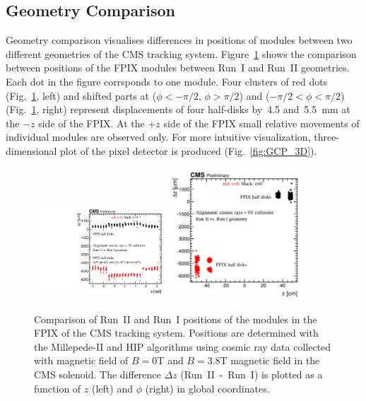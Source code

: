 \subsection{Geometry Comparison}
\label{sec:AlRes_GCP}

Geometry comparison visualises differences in positions of modules between two different geometries of the CMS tracking system. Figure~\ref{fig:GCP_FPIX} shows the comparison between positions of the FPIX modules between Run~I and Run~II geometries. Each dot in the figure corrsponds to one module. Four clusters of red dots (Fig.~\ref{fig:GCP_FPIX}, left) and shifted parts at ($\phi<-\pi/2$, $\phi>\pi/2$) and ($-\pi/2<\phi<\pi/2$) (Fig.~\ref{fig:GCP_FPIX}, right) represent displacements of four half-disks by~4.5 and~5.5~mm at the $-z$ side of the FPIX. At the $+z$ side of the FPIX small relative movements of individual modules are observed only. For more intuitive visualization, three-dimensional plot of the pixel detector is produced (Fig.~\ref{fig:GCP_3D}).     

\begin{figure}[htb]
    \begin{center}
        \includegraphics[width=0.45\textwidth]{../figs/Alignment/AlRes_phi_vs_dz_PXF_1.pdf}\includegraphics[width=0.45\textwidth]{../figs/Alignment/AlRes_z_vs_dz_PXF_1.png}
    \end{center}
    \caption{Comparison of Run~II and Run~I positions of the modules in the FPIX of the CMS tracking system. Positions are determined with the Millepede-II and HIP algorithms using cosmic ray data collected with magnetic field of $B=0$T and $B=3.8$T magnetic field in the CMS solenoid. The difference $\Delta z$ (Run~II~-~Run~I) is plotted as a function of $z$ (left) and $\phi$ (right) in global coordinates.}
    \label{fig:GCP_FPIX}
\end{figure}

